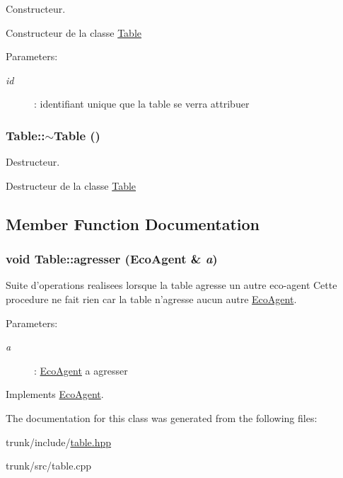 Constructeur. 

Constructeur de la classe \hyperlink{classTable}{Table}

\begin{Desc}
\item[Parameters:]
\begin{description}
\item[{\em id}]: identifiant unique que la table se verra attribuer \end{description}
\end{Desc}
\hypertarget{classTable_9a559f2e7beb37b511ee9f88873164f8}{
\subsubsection[{$\sim$Table}]{\setlength{\rightskip}{0pt plus 5cm}Table::$\sim$Table ()}}
\label{classTable_9a559f2e7beb37b511ee9f88873164f8}


Destructeur. 

Destructeur de la classe \hyperlink{classTable}{Table} 

\subsection{Member Function Documentation}
\hypertarget{classTable_e636451a26e8fd61aa9b4c09a92262f7}{
\subsubsection[{agresser}]{\setlength{\rightskip}{0pt plus 5cm}void Table::agresser ({\bf EcoAgent} \& {\em a})}}
\label{classTable_e636451a26e8fd61aa9b4c09a92262f7}


Suite d'operations realisees lorsque la table agresse un autre eco-agent Cette procedure ne fait rien car la table n'agresse aucun autre \hyperlink{classEcoAgent}{EcoAgent}. 

\begin{Desc}
\item[Parameters:]
\begin{description}
\item[{\em a}]: \hyperlink{classEcoAgent}{EcoAgent} a agresser \end{description}
\end{Desc}


Implements \hyperlink{classEcoAgent_867f0c274eb3ed0b61cb1fe7baa67edd}{EcoAgent}.

The documentation for this class was generated from the following files:\begin{CompactItemize}
\item 
trunk/include/\hyperlink{table_8hpp}{table.hpp}\item 
trunk/src/table.cpp\end{CompactItemize}
